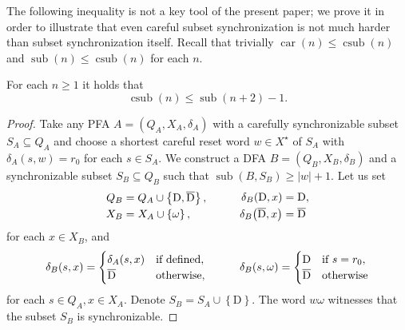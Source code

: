 \documentclass{ws-ijmpc}
\DeclareMathOperator{\car}{car}
\DeclareMathOperator{\sub}{sub}
\DeclareMathOperator{\csub}{csub}
\begin{document}
The following inequality is not a key tool of the present paper; we
prove it in order to illustrate that even careful subset synchronization
is not much harder than subset synchronization itself. Recall that
trivially $\car\!\left(n\right)\le\csub\!\left(n\right)$ and $\sub\!\left(n\right)\le\csub\!\left(n\right)$
for each $n$.
\begin{lemma}
\label{lem: car->sub}For each $n\ge1$ it holds that
\[
\csub\!\left(n\right)\le\sub\!\left(n+2\right)-1.
\]
\end{lemma}
\begin{proof}
Take any PFA $A=\left(Q_{A},X_{A},\delta_{A}\right)$ with a carefully
synchronizable subset $S_{A}\subseteq Q_{A}$ and choose a shortest
careful reset word $w\in X^{\star}$ of $S_{A}$ with $\delta_{A}\!\left(s,w\right)=r_{0}$
for each $s\in S_{A}$. We construct a DFA $B=\left(Q_{B},X_{B},\delta_{B}\right)$
and a synchronizable subset $S_{B}\subseteq Q_{B}$ such that $\sub\!\left(B,S_{B}\right)\ge\left|w\right|+1$.
Let us set
\[
\begin{array}{cc}
\begin{aligned}Q_{B} & =Q_{A}\cup\left\{ \mathrm{D},\overline{\mathrm{D}}\right\} ,\\
X_{B} & =X_{A}\cup\left\{ \omega\right\} ,
\end{aligned}
\hspace{20bp} & \begin{aligned}\delta_{B}\!\left(\mathrm{D},x\right) & =\mathrm{D},\\
\delta_{B}\!\left(\mathrm{\overline{D}},x\right) & =\mathrm{\overline{D}}
\end{aligned}
\end{array}
\]
for each $x\in X_{B}$, and
\[
\begin{array}{cc}
\delta_{B}\!\left(s,x\right)=\begin{cases}
\delta_{A}\!\left(s,x\right) & \mbox{if defined},\\
\overline{\mathrm{D}} & \mbox{otherwise},
\end{cases}\hspace{20bp} & \delta_{B}\!\left(s,\omega\right)=\begin{cases}
\mathrm{D} & \mbox{if }s=r_{0},\\
\overline{\mathrm{D}} & \mbox{otherwise}
\end{cases}\end{array}
\]
for each $s\in Q_{A},x\in X_{A}$. Denote $S_{B}=S_{A}\cup\left\{ \mathrm{D}\right\} .$
The word $w\omega$ witnesses that the subset $S_{B}$ is synchronizable.

\end{proof}
\end{document}
